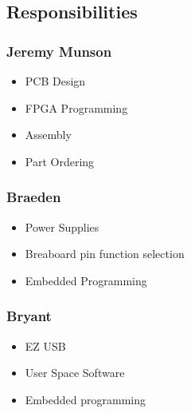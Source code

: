 \subsection{Responsibilities}
	\subsubsection{Jeremy Munson}
		\begin{itemize}
			\item PCB Design
			\item FPGA Programming
			\item Assembly
			\item Part Ordering
		\end{itemize}

	\subsubsection{Braeden}
		\begin{itemize}
			\item Power Supplies
			\item Breaboard pin function selection
			\item Embedded Programming
		\end{itemize}
		
	\subsubsection{Bryant}
		\begin{itemize}
			\item EZ USB
			\item User Space Software
			\item Embedded programming
		\end{itemize}